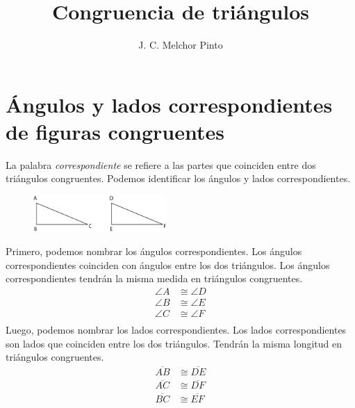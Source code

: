\documentclass[12pt]{guia}
\title{Congruencia de triángulos}
\author{J. C. Melchor Pinto}
\begin{document}
\pagestyle{headandfoot}
\addpoints
\INFO
\printanswers





\newpage
\section{Ángulos y lados correspondientes de figuras congruentes}
La palabra \emph{correspondiente} se refiere a las partes que coinciden entre dos triángulos congruentes. Podemos identificar los ángulos y lados correspondientes.
\begin{figure}[H]
    \centering
    \includegraphics[width=0.45\textwidth]{../images/congruencia02}
    \caption{}
    \label{fig:congruencia01}
\end{figure}
Primero, podemos nombrar los ángulos correspondientes. Los ángulos correspondientes coinciden con ángulos entre los dos triángulos. Los ángulos correspondientes tendrán la misma medida en triángulos congruentes.
\begin{align*}
    \angle A & \cong \angle D \\
    \angle B & \cong \angle E \\
    \angle C & \cong \angle F \\
\end{align*}
Luego, podemos nombrar los lados correspondientes. Los lados correspondientes son lados que coinciden entre los dos triángulos. Tendrán la misma longitud en triángulos congruentes.
\begin{align*}
    \overline{AB} & \cong \overline{DE} \\
    \overline{AC} & \cong \overline{DF} \\
    \overline{BC} & \cong \overline{EF} \\
\end{align*}
\end{document}
